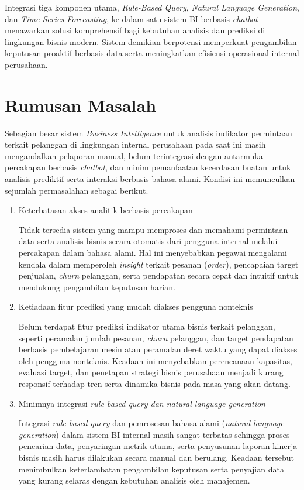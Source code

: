 Integrasi tiga komponen utama, \textit{Rule-Based Query}, \textit{Natural Language Generation}, dan \textit{Time Series Forecasting}, ke dalam satu sistem BI berbasis \textit{chatbot} menawarkan solusi komprehensif bagi kebutuhan analisis dan prediksi di lingkungan bisnis modern. Sistem demikian berpotensi memperkuat pengambilan keputusan proaktif berbasis data serta meningkatkan efisiensi operasional internal perusahaan.

\section{Rumusan Masalah}

Sebagian besar sistem \textit{Business Intelligence} untuk analisis indikator permintaan terkait pelanggan di lingkungan internal perusahaan pada saat ini masih mengandalkan pelaporan manual, belum terintegrasi dengan antarmuka percakapan berbasis \textit{chatbot}, dan minim pemanfaatan kecerdasan buatan untuk analisis prediktif serta interaksi berbasis bahasa alami. Kondisi ini memunculkan sejumlah permasalahan sebagai berikut.

\begin{enumerate}
  \item Keterbatasan akses analitik berbasis percakapan
  
  Tidak tersedia sistem yang mampu memproses dan memahami permintaan data serta analisis bisnis secara otomatis dari pengguna internal melalui percakapan dalam bahasa alami. Hal ini menyebabkan pegawai mengalami kendala dalam memperoleh \textit{insight} terkait pesanan (\textit{order}), pencapaian target penjualan, \textit{churn} pelanggan, serta pendapatan secara cepat dan intuitif untuk mendukung pengambilan keputusan harian.

  \item Ketiadaan fitur prediksi yang mudah diakses pengguna nonteknis
  
  Belum terdapat fitur prediksi indikator utama bisnis terkait pelanggan, seperti peramalan jumlah pesanan, \textit{churn} pelanggan, dan target pendapatan berbasis pembelajaran mesin atau peramalan deret waktu yang dapat diakses oleh pengguna nonteknis. Keadaan ini menyebabkan perencanaan kapasitas, evaluasi target, dan penetapan strategi bisnis perusahaan menjadi kurang responsif terhadap tren serta dinamika bisnis pada masa yang akan datang.

  \item Minimnya integrasi \textit{rule-based query dan \textit{natural language generation}}
  
  Integrasi \textit{rule-based query} dan pemrosesan bahasa alami (\textit{natural language generation}) dalam sistem BI internal masih sangat terbatas sehingga proses pencarian data, penyaringan metrik utama, serta penyusunan laporan kinerja bisnis masih harus dilakukan secara manual dan berulang. Keadaan tersebut menimbulkan keterlambatan pengambilan keputusan serta penyajian data yang kurang selaras dengan kebutuhan analisis oleh manajemen.
\end{enumerate}

